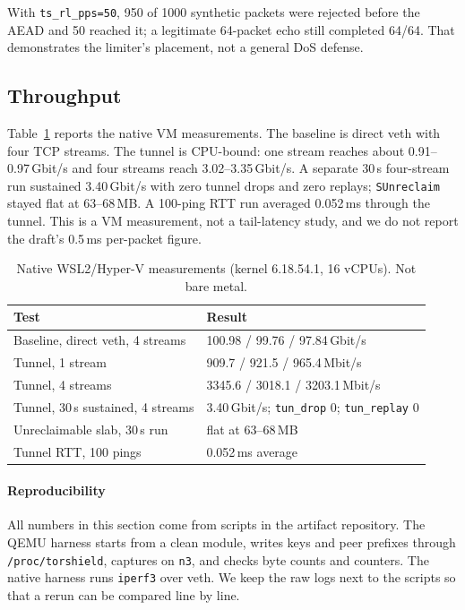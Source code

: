 \documentclass[conference]{IEEEtran}
\newcommand{\code}[1]{\texttt{#1}}
\begin{document}
With \code{ts\_rl\_pps=50}, 950 of 1000 synthetic packets were rejected before the AEAD and 50 reached it; a legitimate 64-packet echo still completed 64/64. That demonstrates the limiter's placement, not a general DoS defense.

\subsection{Throughput}
Table~\ref{tab:perf} reports the native VM measurements. The baseline is direct veth with four TCP streams. The tunnel is CPU-bound: one stream reaches about 0.91--0.97\,Gbit/s and four streams reach 3.02--3.35\,Gbit/s. A separate 30\,s four-stream run sustained 3.40\,Gbit/s with zero tunnel drops and zero replays; \code{SUnreclaim} stayed flat at 63--68\,MB. A 100-ping RTT run averaged 0.052\,ms through the tunnel. This is a VM measurement, not a tail-latency study, and we do not report the draft's 0.5\,ms per-packet figure.

\begin{table}[t]
\centering
\caption{Native WSL2/Hyper-V measurements (kernel 6.18.54.1, 16 vCPUs). Not bare metal.}
\label{tab:perf}
\footnotesize
\setlength{\tabcolsep}{3pt}
\begin{tabular}{@{}p{}p{}@{}}
\toprule
Test & Result \\
\midrule
Baseline, direct veth, 4 streams & 100.98 / 99.76 / 97.84\,Gbit/s \\
Tunnel, 1 stream & 909.7 / 921.5 / 965.4\,Mbit/s \\
Tunnel, 4 streams & 3345.6 / 3018.1 / 3203.1\,Mbit/s \\
Tunnel, 30\,s sustained, 4 streams & 3.40\,Gbit/s; \code{tun\_drop} 0; \code{tun\_replay} 0 \\
Unreclaimable slab, 30\,s run & flat at 63--68\,MB \\
Tunnel RTT, 100 pings & 0.052\,ms average \\
\bottomrule
\end{tabular}
\end{table}

\paragraph{Reproducibility}
All numbers in this section come from scripts in the artifact repository. The QEMU harness starts from a clean module, writes keys and peer prefixes through \code{/proc/torshield}, captures on \code{n3}, and checks byte counts and counters. The native harness runs \code{iperf3} over veth. We keep the raw logs next to the scripts so that a rerun can be compared line by line.
\end{document}
